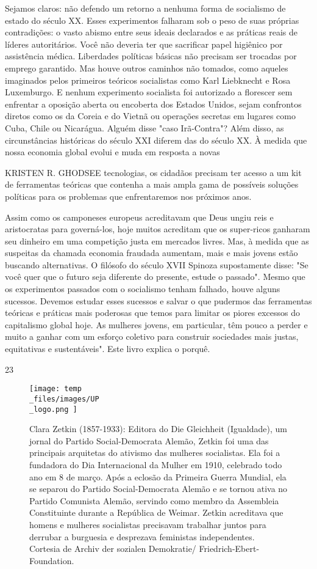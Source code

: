  \par 
Sejamos claros: não defendo um retorno a nenhuma forma de socialismo de estado do século XX. Esses experimentos falharam sob o peso de suas próprias contradições: o vasto abismo entre seus ideais declarados e as práticas reais de líderes autoritários. Você não deveria ter que sacrificar papel higiênico por assistência médica. Liberdades políticas básicas não precisam ser trocadas por emprego garantido. Mas houve outros caminhos não tomados, como aqueles imaginados pelos primeiros teóricos socialistas como Karl Liebknecht e Rosa Luxemburgo. E nenhum experimento socialista foi autorizado a florescer sem enfrentar a oposição aberta ou encoberta dos Estados Unidos, sejam confrontos diretos como os da Coreia e do Vietnã ou operações secretas em lugares como Cuba, Chile ou Nicarágua. Alguém disse "caso Irã-Contra"? Além disso, as circunstâncias históricas do século XXI diferem das do século XX. À medida que nossa economia global evolui e muda em resposta a novas
 \par 
KRISTEN R. GHODSEE tecnologias, os cidadãos precisam ter acesso a um kit de ferramentas teóricas que contenha a mais ampla gama de possíveis soluções políticas para os problemas que enfrentaremos nos próximos anos.
 \par 
Assim como os camponeses europeus acreditavam que Deus ungiu reis e aristocratas para governá-los, hoje muitos acreditam que os super-ricos ganharam seu dinheiro em uma competição justa em mercados livres. Mas, à medida que as suspeitas da chamada economia fraudada aumentam, mais e mais jovens estão buscando alternativas. O filósofo do século XVII Spinoza supostamente disse: "Se você quer que o futuro seja diferente do presente, estude o passado". Mesmo que os experimentos passados ​​com o socialismo tenham falhado, houve alguns sucessos. Devemos estudar esses sucessos e salvar o que pudermos das ferramentas teóricas e práticas mais poderosas que temos para limitar os piores excessos do capitalismo global hoje. As mulheres jovens, em particular, têm pouco a perder e muito a ganhar com um esforço coletivo para construir sociedades mais justas, equitativas e sustentáveis". Este livro explica o porquê.
 \par 
23
 \par 
\begin{figure}
	\centering
	\texttt{[image: temp\\\_files/images/UP\\\_logo.png ]}
	\caption{Clara Zetkin (1857-1933): Editora do Die Gleichheit (Igualdade), um jornal do Partido Social-Democrata Alemão, Zetkin foi uma das principais arquitetas do ativismo das mulheres socialistas. Ela foi a fundadora do Dia Internacional da Mulher em 1910, celebrado todo ano em {\color{blue}8} de março. Após a eclosão da Primeira Guerra Mundial, ela se separou do Partido Social-Democrata Alemão e se tornou ativa no Partido Comunista Alemão, servindo como membro da Assembleia Constituinte durante a República de Weimar. Zetkin acreditava que homens e mulheres socialistas precisavam trabalhar juntos para derrubar a burguesia e desprezava feministas independentes. Cortesia de Archiv der sozialen Demokratie/ Friedrich-Ebert-Foundation.}
	\label{ }
\end{figure}